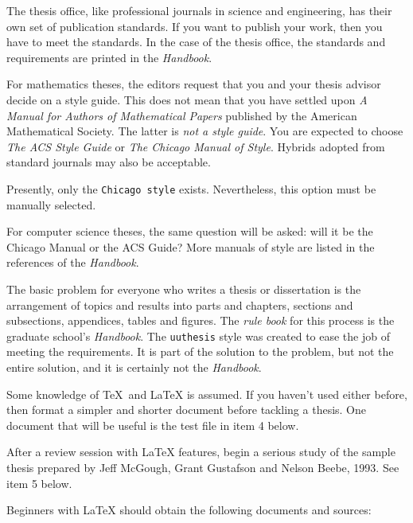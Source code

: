 The thesis office, like professional journals in science and engineering,
has their own set of publication standards. If you want to publish your
work, then you have to meet the standards. In the case of the thesis
office, the standards and requirements are printed in the {\em
Handbook}.

For mathematics theses,
the editors request that you and your thesis advisor decide on a style
guide. This does not mean that you have settled upon {\em A Manual for
Authors of Mathematical Papers} published by the American Mathematical
Society. The latter is {\em not a style guide}. You are expected to
choose {\em The ACS Style Guide} or {\em The Chicago Manual of Style}.
Hybrids adopted from standard journals may also be acceptable.

Presently, only the {\tt Chicago style} exists. Nevertheless, this option
must be manually selected.

For computer science theses, the same question will be asked: will it be
the Chicago Manual or the ACS Guide? More manuals of style are listed in
the references of the {\em Handbook}.

The basic problem for everyone who writes a thesis or dissertation is
the arrangement of topics and results into parts and chapters, sections
and subsections, appendices, tables and figures. The {\em rule book} for
this process is the graduate school's {\em Handbook}.
The {\tt uuthesis} style was created to ease the job of meeting the
requirements. It is part of the solution to the problem, but not the
entire solution, and it is certainly not the {\em Handbook}.

Some knowledge of \TeX\ and \LaTeX{} is assumed. If you haven't used
either before, then format a simpler and shorter document before
tackling a thesis. One document that will be useful is the test file in
item 4 below.

After a review session with \LaTeX{} features, begin a serious study of
the sample thesis prepared by Jeff McGough, Grant Gustafson and Nelson
Beebe, 1993. See item 5 below.

Beginners with \LaTeX{} should obtain the following documents and
sources:

